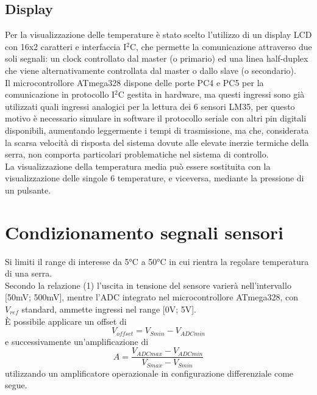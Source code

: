 \documentclass[12pt]{article}
\begin{document}
    \subsection{Display}
    Per la visualizzazione delle temperature è stato scelto l'utilizzo di un display LCD con 16x2 caratteri e interfaccia I$^2$C, che permette la comunicazione attraverso due soli se\-gna\-li: un clock controllato dal master (o primario) ed una linea half-duplex che viene alternativamente controllata dal master o dallo slave (o secondario).\\
    Il microcontrollore ATmega328 dispone delle porte PC4 e PC5 per la comunicazione in protocollo I$^2$C gestita in hardware, ma questi ingressi sono già utilizzati quali ingressi analogici per la lettura dei 6 sensori LM35, per questo motivo è necessario simulare in software il protocollo seriale con altri pin digitali disponibili, aumentando leggermente i tempi di trasmissione, ma che, considerata la scarsa velocità di risposta del sistema dovute alle elevate inerzie termiche della serra, non comporta particolari problematiche nel sistema di controllo.\\
    La visualizzazione della temperatura media può essere sostituita con la visualizzazione delle singole 6 temperature, e viceversa, mediante la pressione di un pulsante.

\vspace{1cm}

\section{Condizionamento segnali sensori}
    Si limiti il range di interesse da 5°C a 50°C in cui rientra la regolare temperatura di una serra.\\
    Secondo la relazione (1) l'uscita in tensione del sensore varierà nell'intervallo [50mV; 500mV], mentre l'ADC integrato nel microcontrollore ATmega328, con $V_{ref}$ standard, ammette ingressi nel range [0V; 5V].\\
        È possibile applicare un offset di 
        \begin{equation}
            {V_{offset}} = V_{Smin} - V_{ADCmin}
        \end{equation}
        e successivamente un'amplificazione di
        \begin{equation}
            A = \frac{V_{ADCmax}-V_{ADCmin}}{V_{Smax} - V_{Smin}}
        \end{equation}
        utilizzando un amplificatore operazionale in configurazione differenziale come segue.
\end{document}
